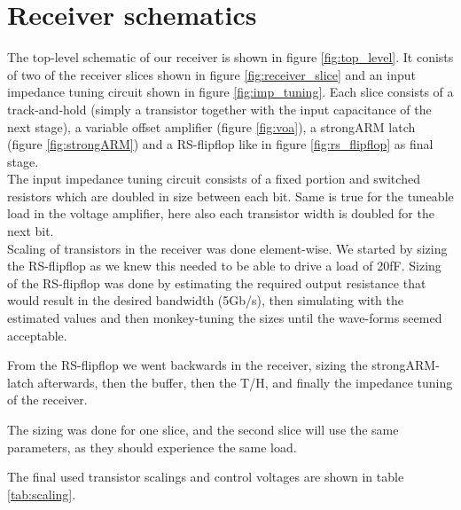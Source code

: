 \section{Receiver schematics}
\label{sec:rx_schematics}

The top-level schematic of our receiver is shown in figure \ref{fig:top_level}. It conists of two of the receiver slices shown in figure \ref{fig:receiver_slice} and an input impedance tuning circuit shown in figure \ref{fig:imp_tuning}. Each slice consists of a track-and-hold (simply a transistor together with the input capacitance of the next stage), a variable offset amplifier (figure \ref{fig:voa}), a strongARM latch (figure \ref{fig:strongARM}) and a RS-flipflop like in figure \ref{fig:rs_flipflop} as final stage.\\
The input impedance tuning circuit consists of a fixed portion and switched resistors which are doubled in size between each bit. Same is true for the tuneable load in the voltage amplifier, here also each transistor width is doubled for the next bit.\\

Scaling of transistors in the receiver was done element-wise. We started by sizing the RS-flipflop as we knew this needed to be able to drive a load of 20fF. Sizing of the RS-flipflop was done by estimating the required output resistance that would result in the desired bandwidth (5Gb/s), then simulating with the estimated values and then monkey-tuning the sizes until the wave-forms seemed acceptable.

From the RS-flipflop we went backwards in the receiver, sizing the strongARM-latch afterwards, then the buffer, then the T/H, and finally the impedance tuning of the receiver.

The sizing was done for one slice, and the second slice will use the same parameters, as they should experience the same load.

The final used transistor scalings and control voltages are shown in table \ref{tab:scaling}.

